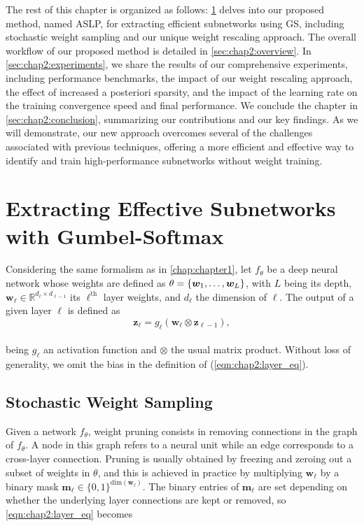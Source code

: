 The rest of this chapter is organized as follows: \cref{sec:chap2:method} delves
into our proposed method, named \acf{ASLP}, for extracting efficient subnetworks
using \acl{GS}, including stochastic weight sampling and our unique weight
rescaling approach. The overall workflow of our proposed method is detailed in
\cref{sec:chap2:overview}. In \cref{sec:chap2:experiments}, we share the results
of our comprehensive experiments, including performance benchmarks, the impact
of our weight rescaling approach, the effect of increased a posteriori sparsity,
and the impact of the learning rate on the training convergence speed and final
performance. We conclude the chapter in \cref{sec:chap2:conclusion}, summarizing
our contributions and our key findings. As we will demonstrate, our new approach
overcomes several of the challenges associated with previous techniques,
offering a more efficient and effective way to identify and train
high-performance subnetworks without weight training.


\section{Extracting Effective Subnetworks with Gumbel-Softmax}\label{sec:chap2:method}

Considering the same formalism as in \cref{chap:chapter1}, let $f_\theta$ be a
deep neural network whose weights are defined as $\theta =
  \left\{\bm{w}_1,\mathellipsis, \bm{w}_L \right\}$, with $L$ being its depth,
$\bm{w}_\ell \in \mathbb{R}^{d_{\ell} \times d_{\ell-1}}$ its $\ell^\textrm{th}$
layer weights, and $d_\ell$ the dimension of $\ell$. The output of a given layer
$\ell$ is defined as \\

\begin{equation}
  \label{eqn:chap2:layer_eq}
  \mathbf{z}_{\ell} = g_\ell(\bm{w}_\ell \otimes \mathbf{z}_{\ell-1}),
\end{equation}\\

being  $g_\ell$ an activation function and $\otimes$ the usual matrix product.
Without loss of generality, we omit the bias in the definition of
(\ref{eqn:chap2:layer_eq}).

\subsection{Stochastic Weight Sampling}
\label{sec:chap2:stochastic-sampling}
\indent Given a network $f_\theta$, weight pruning consists in removing
connections in the graph of $f_\theta$. A node in this graph refers to a neural
unit while an edge corresponds to a cross-layer connection. Pruning is usually
obtained by freezing and zeroing out  a subset of weights in $\theta$, and this
is achieved in practice by multiplying $\bm{w}_\ell$ by a binary mask
$\bm{m}_\ell \in \{ 0,1 \}^{\text{dim}(\bm{w}_\ell)}$. The binary entries of
$\bm{m}_\ell$ are set depending on whether the underlying layer connections are
kept or removed, so \cref{eqn:chap2:layer_eq} becomes\\

